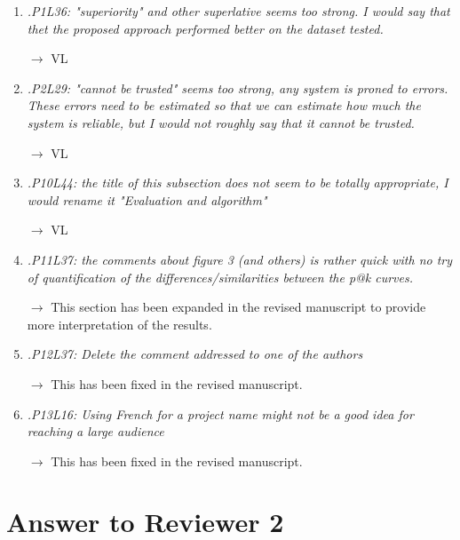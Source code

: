 \documentclass[10pt]{article}
\begin{document}
\begin{enumerate}
\item \emph{.P1L36: "superiority" and other superlative seems too strong. I would say that thet the proposed approach performed better on the dataset tested.}

$\rightarrow$ VL

\item \emph{.P2L29: "cannot be trusted" seems too strong, any system is proned to errors. These errors need to be estimated so that we can estimate how much the system is reliable, but I would not roughly say that it cannot be trusted.}

$\rightarrow$ VL

\item \emph{.P10L44: the title of this subsection does not seem to be totally appropriate, I would rename it "Evaluation and algorithm"}

$\rightarrow$ VL

\item \emph{.P11L37: the comments about figure 3 (and others) is rather quick with no try of quantification of the differences/similarities between the p@k curves.}

$\rightarrow$
This section has been expanded in the revised manuscript to provide more interpretation of the results.

\item \emph{.P12L37: Delete the comment addressed to one of the authors}

$\rightarrow$
This has been fixed in the revised manuscript.

\item \emph{.P13L16: Using French for a project name might not be a good idea for reaching a large audience}

$\rightarrow$
This has been fixed in the revised manuscript.

\end{enumerate}

\section{Answer to Reviewer 2}
\end{document}
